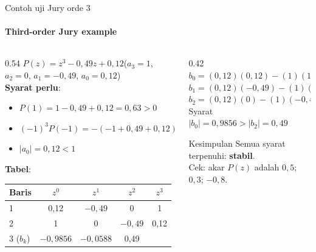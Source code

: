 \documentclass[aspectratio=169,10pt]{beamer}
\begin{document}
\begin{frame}{Contoh uji Jury orde 3}
	\framesubtitle{Third-order Jury example}
	\begin{columns}[T]
		\begin{column}{0.54\textwidth}
			\small
			$P(z) = z^3 - 0{,}49z + 0{,}12$\quad($a_3=1$, $a_2=0$, $a_1=-0{,}49$, $a_0=0{,}12$)\\[4pt]
			\textbf{Syarat perlu}:
			\begin{itemize}
				\item $P(1) = 1 - 0{,}49 + 0{,}12 = 0{,}63 > 0$ \checkmark
				\item $(-1)^3P(-1) = -(-1 + 0{,}49 + 0{,}12) = 0{,}39 > 0$ \checkmark
				\item $|a_0| = 0{,}12 < 1$ \checkmark
			\end{itemize}
			\textbf{Tabel}:
			\renewcommand{\arraystretch}{1.25}
			\begin{tabular}{@{}l c c c c@{}}
				\toprule
				Baris & $z^0$ & $z^1$ & $z^2$ & $z^3$ \\
				\midrule
				1 & 0,12 & $-0{,}49$ & 0 & 1 \\
				2 & 1 & 0 & $-0{,}49$ & 0,12 \\
				3 ($b_k$) & $-0{,}9856$ & $-0{,}0588$ & 0,49 & \\
				\bottomrule
			\end{tabular}
		\end{column}
		\begin{column}{0.42\textwidth}
			\small
			$b_0 = (0{,}12)(0{,}12) - (1)(1) = -0{,}9856$\\
			$b_1 = (0{,}12)(-0{,}49) - (1)(0) = -0{,}0588$\\
			$b_2 = (0{,}12)(0) - (1)(-0{,}49) = 0{,}49$\\[4pt]
			Syarat $|b_0| = 0{,}9856 > |b_2| = 0{,}49$ \checkmark
			\begin{block}{Kesimpulan}
				Semua syarat terpenuhi: \textbf{stabil}.\\
				Cek: akar $P(z)$ adalah $0{,}5$; $0{,}3$; $-0{,}8$.
			\end{block}
		\end{column}
	\end{columns}
\end{frame}
\end{document}
